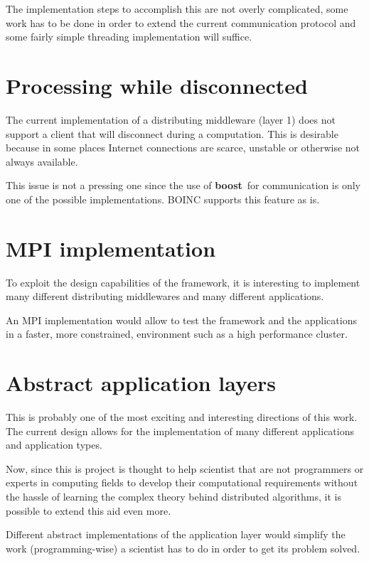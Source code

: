 \documentclass[a4paper,12pt,english]{report}
\newcommand{\boost}{\textbf{boost}}
\begin{document}
The implementation steps to accomplish this are not overly complicated, some work has to be done in order to extend the current communication protocol and some fairly simple threading implementation will suffice.

\section{Processing while disconnected}

The current implementation of a distributing middleware (layer 1) does not support a client that will disconnect during a computation. This is desirable because in some places Internet connections are scarce, unstable or otherwise not always available.

This issue is not a pressing one since the use of \boost \ for communication is only one of the possible  implementations. BOINC supports this feature as is.

\section{MPI implementation}

To exploit the design capabilities of the framework, it is interesting to implement many different distributing middlewares and many different applications.

An MPI implementation would allow to test the framework and the applications in a faster, more constrained, environment such as a high performance cluster.

\section{Abstract application layers}

This is probably one of the most exciting and interesting directions of this work. The current design allows for the implementation of many different applications and application types. 

Now, since this is project is thought to help scientist that are not programmers or experts in computing fields to develop their computational requirements without the hassle of learning the complex theory behind distributed algorithms, it is possible to extend this aid even more.

Different abstract implementations of the application layer would simplify the work (programming-wise) a scientist has to do in order to get its problem solved.
\end{document}
